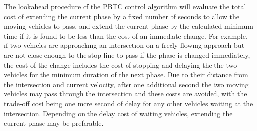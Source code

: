 The lookahead procedure of the PBTC control algorithm will evaluate the total cost of extending the current phase by a fixed number of seconds to allow the moving vehicles to pass, and extend the current phase by the calculated minimum time if it is found to be less than the cost of an immediate change. For example, if two vehicles are approaching an intersection on a freely flowing approach but are not close enough to the stop-line to pass if the phase is changed immediately, the cost of the change includes the cost of stopping and delaying the the two vehicles for the minimum duration of the next phase. Due to their distance from the intersection and current velocity, after one additional second the two moving vehicles may pass through the intersection and these costs are avoided, with the trade-off cost being one more second of delay for any other vehicles waiting at the intersection. Depending on the delay cost of waiting vehicles, extending the current phase may be preferable. 




